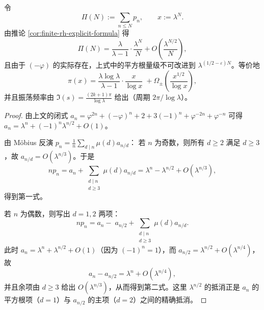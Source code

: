 \begin{corollary}\label{cor:finite-rh-prime-orbit-osc}
令
\[
\Pi(N):=\sum_{n\le N}p_n,\qquad x:=\lambda^N.
\]
由推论 \ref{cor:finite-rh-explicit-formula} 得
\[
\Pi(N)=\frac{\lambda}{\lambda-1}\cdot\frac{\lambda^N}{N}+O\!\left(\frac{\lambda^{N/2}}{N}\right),
\]
且由于 $(-\varphi)$ 的实际存在，上式中的平方根量级不可改进到 $\lambda^{(1/2-\varepsilon)N}$。等价地
\[
\pi(x)=\frac{\lambda\log\lambda}{\lambda-1}\cdot\frac{x}{\log x}
\;+\Omega_{\pm}\!\left(\frac{x^{1/2}}{\log x}\right),
\]
并且振荡频率由 $\Im(s)=\frac{(2k+1)\pi}{\log\lambda}$ 给出（周期 $2\pi/\log\lambda$）。
\end{corollary}

\begin{proof}
由上文的闭式
\(
a_n=\varphi^{2n}+(-\varphi)^n+2+3(-1)^n+\varphi^{-2n}+\varphi^{-n}
\)
可得
\(
a_n=\lambda^n+(-1)^n\lambda^{n/2}+O(1)
\)。

由 Möbius 反演 $p_n=\frac1n\sum_{d\mid n}\mu(d)a_{n/d}$：
若 $n$ 为奇数，则所有 $d\ge 2$ 满足 $d\ge 3$，故 $a_{n/d}=O(\lambda^{n/3})$。于是
\[
np_n=a_n+\sum_{\substack{d\mid n\\ d\ge 3}}\mu(d)a_{n/d}
=\lambda^n-\lambda^{n/2}+O(\lambda^{n/3}),
\]
得到第一式。

若 $n$ 为偶数，则写出 $d=1,2$ 两项：
\[
np_n=a_n-\;a_{n/2}+\sum_{\substack{d\mid n\\ d\ge 3}}\mu(d)a_{n/d}.
\]
此时 $a_n=\lambda^n+\lambda^{n/2}+O(1)$（因为 $(-1)^n=1$），而 $a_{n/2}=\lambda^{n/2}+O(\lambda^{n/4})$，故
\[
a_n-a_{n/2}=\lambda^n+O(\lambda^{n/4}),
\]
并且余项由 $d\ge 3$ 给出 $O(\lambda^{n/3})$，从而得到第二式。这里 $\lambda^{n/2}$ 的抵消正是 $a_n$ 的平方根项（$d=1$）与 $a_{n/2}$ 的主项（$d=2$）之间的精确抵消。
\end{proof}
